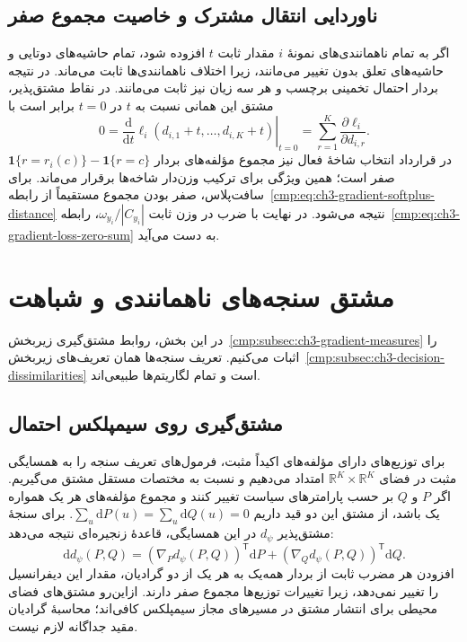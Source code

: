 \subsection{ناوردایی انتقال مشترک و خاصیت مجموع صفر}
\label{app:ch3-gradient-loss-zero-sum}

اگر به تمام ناهمانندی‌های نمونهٔ $i$ مقدار
ثابت $t$ افزوده شود، تمام حاشیه‌های دوتایی
و حاشیه‌های تعلق بدون تغییر می‌مانند، زیرا
اختلاف ناهمانندی‌ها ثابت می‌ماند. در نتیجه
بردار احتمال تخمینی برچسب و هر سه زیان نیز
ثابت می‌مانند. در نقاط مشتق‌پذیر، مشتق این
همانی نسبت به $t$ در $t=0$ برابر است با
\[
0=\left.\frac{\mathrm d}{\mathrm dt}
\ell_i(d_{i,1}+t,\ldots,d_{i,K}+t)\right|_{t=0}
=\sum_{r=1}^{K}\frac{\partial\ell_i}{\partial d_{i,r}}.
\]
در قرارداد انتخاب شاخهٔ فعال نیز مجموع
مؤلفه‌های بردار
$\mathbf1\{r=r_i(c)\}-\mathbf1\{r=c\}$
صفر است؛ همین ویژگی برای ترکیب وزن‌دار
شاخه‌ها برقرار می‌ماند. برای سافت‌پلاس، صفر
بودن مجموع مستقیماً از
رابطه~\eqref{cmp:eq:ch3-gradient-softplus-distance}
نتیجه می‌شود. در نهایت با ضرب در وزن ثابت
$\omega_{y_i}/|C_{y_i}|$،
رابطه~\eqref{cmp:eq:ch3-gradient-loss-zero-sum}
به دست می‌آید.

\section{مشتق سنجه‌های ناهمانندی و شباهت}
\label{app:ch3-gradient-measures}

در این بخش، روابط مشتق‌گیری
زیربخش~\ref{cmp:subsec:ch3-gradient-measures}
را اثبات می‌کنیم. تعریف سنجه‌ها همان تعریف‌های
زیربخش~\ref{cmp:subsec:ch3-decision-dissimilarities}
است و تمام لگاریتم‌ها طبیعی‌اند.

\subsection{مشتق‌گیری روی سیمپلکس احتمال}
\label{app:ch3-gradient-measures-simplex}

برای توزیع‌های دارای مؤلفه‌های اکیداً مثبت،
فرمول‌های تعریف سنجه را به همسایگی مثبت
در فضای $\mathbb R^K\times\mathbb R^K$ امتداد
می‌دهیم و نسبت به مختصات مستقل مشتق می‌گیریم.
اگر $P$ و $Q$ بر حسب پارامترهای سیاست
تغییر کنند و مجموع مؤلفه‌های هر یک همواره
یک باشد، از مشتق این دو قید داریم
$\sum_u\mathrm dP(u)=\sum_u\mathrm dQ(u)=0$.
برای سنجهٔ مشتق‌پذیر $d_\psi$ در این همسایگی،
قاعدهٔ زنجیره‌ای نتیجه می‌دهد:
\[
\mathrm d d_\psi(P,Q)
=(\nabla_P d_\psi(P,Q))^{\mathsf T}\mathrm dP
+(\nabla_Q d_\psi(P,Q))^{\mathsf T}\mathrm dQ.
\]
افزودن هر مضرب ثابت از بردار همه‌یک به
هر یک از دو گرادیان، مقدار این دیفرانسیل را
تغییر نمی‌دهد، زیرا تغییرات توزیع‌ها مجموع
صفر دارند. ازاین‌رو مشتق‌های فضای محیطی برای
انتشار مشتق در مسیرهای مجاز سیمپلکس کافی‌اند؛
محاسبهٔ گرادیان مقید جداگانه لازم نیست.

